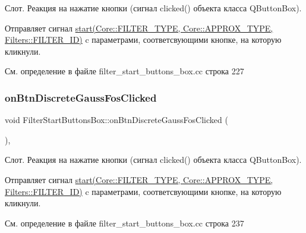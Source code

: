 Слот. Реакция на нажатие кнопки (сигнал clicked() объекта класса Q\+Button\+Box).

Отправляет сигнал \hyperlink{class_filter_start_buttons_box_ac6e2a6555f1d388391f188f834b8e753}{start(\+Core\+::\+F\+I\+L\+T\+E\+R\+\_\+\+T\+Y\+P\+E, Core\+::\+A\+P\+P\+R\+O\+X\+\_\+\+T\+Y\+P\+E, Filters\+::\+F\+I\+L\+T\+E\+R\+\_\+\+I\+D)} c параметрами, соответсвующими кнопке, на которую кликнули. 

См. определение в файле filter\+\_\+start\+\_\+buttons\+\_\+box.\+cc строка 227

\hypertarget{class_filter_start_buttons_box_a0285f32777c968c369c25c91940837d0}{}\label{class_filter_start_buttons_box_a0285f32777c968c369c25c91940837d0} 
\subsubsection{\texorpdfstring{on\+Btn\+Discrete\+Gauss\+Fos\+Clicked}{onBtnDiscreteGaussFosClicked}}
{\footnotesize\ttfamily void Filter\+Start\+Buttons\+Box\+::on\+Btn\+Discrete\+Gauss\+Fos\+Clicked (\begin{DoxyParamCaption}{ }\end{DoxyParamCaption})\hspace{0.3cm}{\ttfamily [private]}, {\ttfamily [slot]}}

Слот. Реакция на нажатие кнопки (сигнал clicked() объекта класса Q\+Button\+Box).

Отправляет сигнал \hyperlink{class_filter_start_buttons_box_ac6e2a6555f1d388391f188f834b8e753}{start(\+Core\+::\+F\+I\+L\+T\+E\+R\+\_\+\+T\+Y\+P\+E, Core\+::\+A\+P\+P\+R\+O\+X\+\_\+\+T\+Y\+P\+E, Filters\+::\+F\+I\+L\+T\+E\+R\+\_\+\+I\+D)} c параметрами, соответсвующими кнопке, на которую кликнули. 

См. определение в файле filter\+\_\+start\+\_\+buttons\+\_\+box.\+cc строка 237

\hypertarget{class_filter_start_buttons_box_adbba7359eb2dd93c889c62665f5f70c2}{}\label{class_filter_start_buttons_box_adbba7359eb2dd93c889c62665f5f70c2} 
